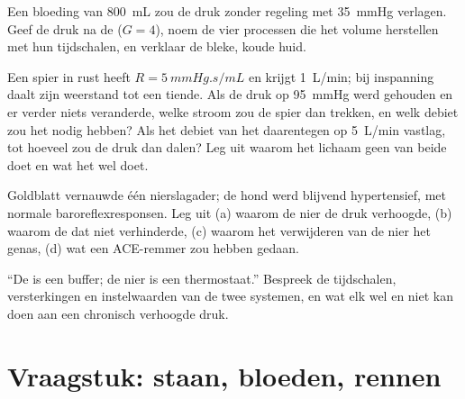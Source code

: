 \begin{exercise}[$\star\star$]\label{exo:b2:blood-pressure:9}
Een bloeding van \qty{800}{mL} zou de druk zonder regeling met
\qty{35}{mmHg} verlagen. Geef de druk na de  ($G = 4$), noem de
vier processen die het volume herstellen met hun tijdschalen, en verklaar de
bleke, koude huid.
\end{exercise}

\begin{exercise}[$\star\star\star$]\label{exo:b2:blood-pressure:10}
Een spier in rust heeft $R = \qty{5}{mmHg.s/mL}$ en krijgt
\qty{1}{L/min}; bij inspanning daalt zijn weerstand tot een tiende. Als de
druk op \qty{95}{mmHg} werd gehouden en er verder niets veranderde, welke
stroom zou de spier dan trekken, en welk debiet zou het  nodig hebben?
Als het debiet van het  daarentegen op \qty{5}{L/min} vastlag, tot hoeveel
zou de druk dan dalen? Leg uit waarom het lichaam geen van beide doet en wat
het wel doet.
\end{exercise}

\begin{exercise}[$\star\star\star$]\label{exo:b2:blood-pressure:11}
Goldblatt vernauwde één nierslagader; de hond werd blijvend hypertensief, met
normale baroreflexresponsen. Leg uit (a) waarom de nier de druk verhoogde,
(b) waarom de  dat niet verhinderde, (c) waarom het verwijderen van
de nier het genas, (d) wat een ACE-remmer zou hebben gedaan.
\end{exercise}

\begin{exercise}[$\star\star\star$]\label{exo:b2:blood-pressure:12}
``De  is een buffer; de nier is een thermostaat.''
Bespreek de tijdschalen, versterkingen en instelwaarden van de twee systemen,
en wat elk wel en niet kan doen aan een chronisch verhoogde druk.
\end{exercise}

\section{Vraagstuk: staan, bloeden, rennen}

